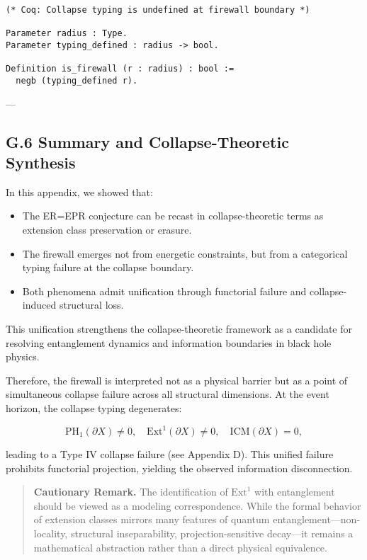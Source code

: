 \documentclass[11pt]{article}
\begin{document}
\begin{lstlisting}
(* Coq: Collapse typing is undefined at firewall boundary *)

Parameter radius : Type.
Parameter typing_defined : radius -> bool.

Definition is_firewall (r : radius) : bool :=
  negb (typing_defined r).
\end{lstlisting}

---

\subsection*{G.6 Summary and Collapse-Theoretic Synthesis}

In this appendix, we showed that:

\begin{itemize}
    \item The ER=EPR conjecture can be recast in collapse-theoretic terms as extension class preservation or erasure.
    \item The firewall emerges not from energetic constraints, but from a categorical typing failure at the collapse boundary.
    \item Both phenomena admit unification through functorial failure and collapse-induced structural loss.
\end{itemize}

This unification strengthens the collapse-theoretic framework as a candidate for resolving entanglement dynamics and information boundaries in black hole physics.

Therefore, the firewall is interpreted not as a physical barrier but as a point of simultaneous collapse failure across all structural dimensions. At the event horizon, the collapse typing degenerates:

\[
\mathrm{PH}_1(\partial X) \neq 0, \quad \mathrm{Ext}^1(\partial X) \neq 0, \quad \mathrm{ICM}(\partial X) = 0,
\]

leading to a Type IV collapse failure (see Appendix D). This unified failure prohibits functorial projection, yielding the observed information disconnection.

\begin{quote}
\textbf{Cautionary Remark.} The identification of $\mathrm{Ext}^1$ with entanglement should be viewed as a modeling correspondence. While the formal behavior of extension classes mirrors many features of quantum entanglement—non-locality, structural inseparability, projection-sensitive decay—it remains a mathematical abstraction rather than a direct physical equivalence.
\end{quote}
\end{document}
